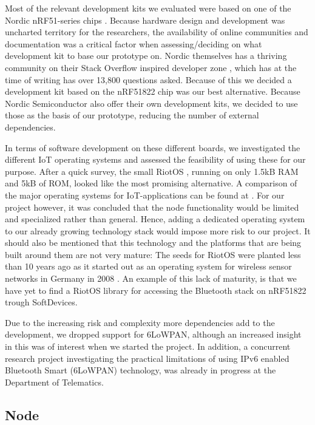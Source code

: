 Most of the relevant development kits we evaluated were based on one of the Nordic nRF51-series chips \cite{newRef:36, newRef:36:2}. Because hardware design and development was uncharted territory for the researchers, the availability of online communities and documentation was a critical factor when assessing/deciding on what development kit to base our prototype on. Nordic themselves has a thriving community on their Stack Overflow inspired developer zone \cite{newRef:50}, which has at the time of writing has over 13,800 questions asked. Because of this we decided a development kit based on the  nRF51822 chip was our best alternative. Because Nordic Semiconductor also offer their own development kits, we decided to use those as the basis of our prototype, reducing the number of external dependencies. 

In terms of software development on these different boards, we investigated the different IoT operating systems and assessed the feasibility of using these for our purpose. After a quick survey, the small RiotOS \cite{Anonymous:a1din1ZK}, running on only 1.5kB RAM and 5kB of ROM, looked like the most promising alternative. A comparison of the major operating systems for IoT-applications can be found at \cite{Anonymous:a1din1ZK}. For our project however, it was concluded that the node functionality would be limited and specialized rather than general. Hence, adding a dedicated operating system to our already growing technology stack would impose more risk to our project. It should also be mentioned that this technology and the platforms that are being built around them are not very mature: The seeds for RiotOS were planted less than 10 years ago as it started out as an operating system for wireless sensor networks in Germany in 2008 \cite{newRef:52}. An example of this lack of maturity, is that we have yet to find a RiotOS library for accessing the Bluetooth stack on nRF51822 trough SoftDevices.

Due to the increasing risk and complexity more dependencies add to the development, we dropped support for 6LoWPAN, although an increased insight in this was of interest when we started the project. In addition, a concurrent research project investigating the practical limitations of using IPv6 enabled Bluetooth Smart (6LoWPAN) technology, was already in progress at the Department of Telematics.


\subsection{Node} %
\label{sub:node}

